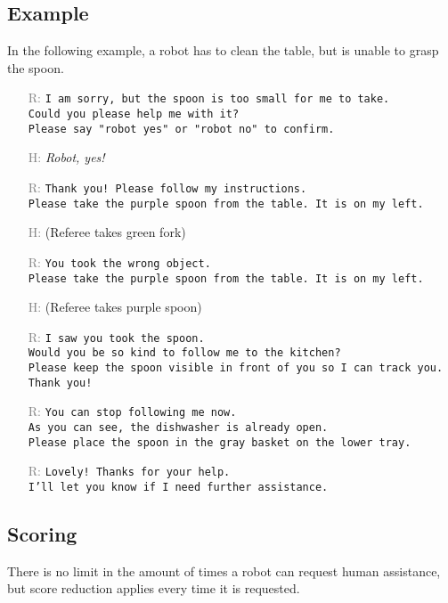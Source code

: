 \subsection*{Example}
\label{rule:continue_example}
In the following example, a robot has to clean the table, but is unable to grasp the spoon.
\begin{itemize}[noitemsep]
	\small
	\item[\textcolor{gray}{R:}] \texttt{I am sorry, but the spoon is too small for me to take.\\
	Could you please help me with it?\\
	Please say "robot yes" or "robot no" to confirm.}
	\item[\textcolor{gray}{H:}] \textit{Robot, yes!}
	\item[\textcolor{gray}{R:}] \texttt{Thank you! Please follow my instructions.\\
	Please take the purple spoon from the table. It is on my left.}
	\item[\textcolor{gray}{H:}] (Referee takes green fork)
	\item[\textcolor{gray}{R:}] \texttt{You took the wrong object.\\
	Please take the purple spoon from the table. It is on my left.}
	\item[\textcolor{gray}{H:}] (Referee takes purple spoon)
	\item[\textcolor{gray}{R:}] \texttt{I saw you took the spoon.\\
	Would you be so kind to follow me to the kitchen?\\
	Please keep the spoon visible in front of you so I can track you. Thank you!}
	\item[\textcolor{gray}{R:}] \texttt{You can stop following me now.\\
	As you can see, the dishwasher is already open.\\
	Please place the spoon in the gray basket on the lower tray.}
	\item[\textcolor{gray}{R:}] \texttt{Lovely! Thanks for your help.\\
	I'll let you know if I need further assistance.}
\end{itemize}



\subsection{Scoring}
\label{rule:continue_scoring}
There is no limit in the amount of times a robot can request human assistance, but score reduction applies every time it is requested.

